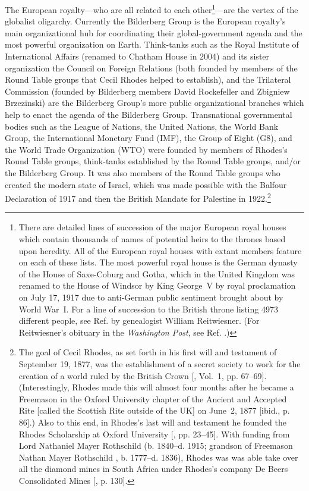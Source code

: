 \documentclass[letterpaper,12pt]{article}
\begin{document}
The European royalty---who are all related to each other\footnote{There are detailed lines of succession of the major European royal houses which contain thousands of names of potential heirs to the thrones based upon heredity. All of the European royal houses with extant members feature on each of these lists. The most powerful royal house is the German dynasty of the House of Saxe-Coburg and Gotha, which in the United Kingdom was renamed to the House of Windsor by King George~V by royal proclamation on July 17, 1917 due to anti-German public sentiment brought about by World War~I. For a line of succession to the British throne listing 4973 different people, see Ref.  by genealogist William Reitwiesner. (For Reitwiesner's obituary in the \emph{Washington Post}, see Ref. .)}---are the vertex of the globalist oligarchy. Currently the Bilderberg Group is the European royalty's main organizational hub for coordinating their global-government agenda and the most powerful organization on Earth. Think-tanks such as the Royal Institute of International Affairs (renamed to Chatham House in 2004) and its sister organization the Council on Foreign Relations (both founded by members of the Round Table groups that Cecil Rhodes helped to establish), and the Trilateral Commission (founded by Bilderberg members David Rockefeller and Zbigniew Brzezinski) are the Bilderberg Group's more public organizational branches which help to enact the agenda of the Bilderberg Group. Transnational governmental bodies such as the League of Nations, the United Nations, the World Bank Group, the International Monetary Fund (IMF), the Group of Eight (G8), and the World Trade Organization (WTO) were founded by members of Rhodes's Round Table groups, think-tanks established by the Round Table groups, and\slash or the Bilderberg Group. It was also members of the Round Table groups who created the modern state of Israel, which was made possible with the Balfour Declaration of 1917 and then the British Mandate for Palestine in 1922.\footnote{\label{foot:GlobalistOligarchy}The goal of Cecil Rhodes, as set forth in his first will and testament of September 19, 1877, was the establishment of a secret society to work for the creation of a world ruled by the British Crown [, Vol.~1, pp. 67--69]. (Interestingly, Rhodes made this will almost four months after he became a Freemason in the Oxford University chapter of the Ancient and Accepted Rite [called the Scottish Rite outside of the UK] on June~2, 1877 [ibid., p. 86].) Also to this end, in Rhodes's last will and testament he founded the Rhodes Scholarship at Oxford University [, pp. 23--45]. With funding from Lord Nathaniel Mayer Rothschild (b. 1840--d. 1915; grandson of Freemason Nathan Mayer Rothschild \cite{Denslow1957}, b. 1777--d. 1836), Rhodes was was able take over all the diamond mines in South Africa under Rhodes's company De Beers Consolidated Mines [, p. 130].\par
}
\end{document}
